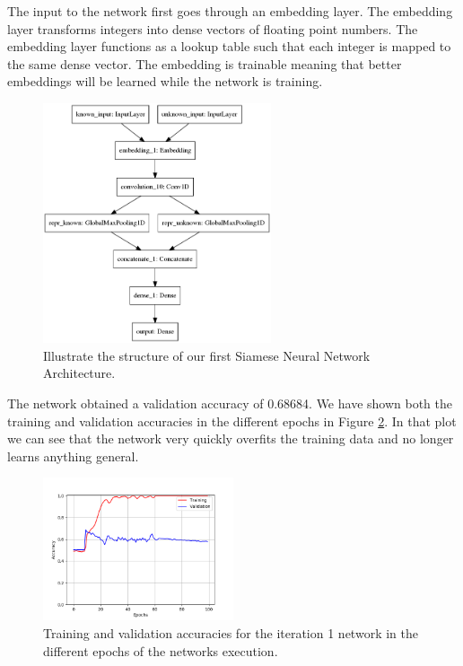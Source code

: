 The input to the network first goes through an embedding layer. The embedding
layer transforms integers into dense vectors of floating point numbers. The
embedding layer functions as a lookup table such that each integer is mapped
to the same dense vector. The embedding is trainable meaning that better
embeddings will be learned while the network is training.

\begin{figure}[htb]
    \centering
    \includegraphics[width=0.6\textwidth]{./pictures/method/network1.png}
    \caption{Illustrate the structure of our first Siamese Neural Network
        Architecture.}
    \label{fig:network_1}
\end{figure}

The network obtained a validation accuracy of 0.68684. We have shown both the
training and validation accuracies in the different epochs in Figure
\ref{fig:network1_accuracies}. In that plot we can see that the network very
quickly overfits the training data and no longer learns anything general.

\begin{figure}[htb]
    \centering
    \includegraphics[width=0.5\textwidth]{./pictures/method/network_1_accuracies.png}
    \caption{Training and validation accuracies for the iteration 1 network in
        the different epochs of the networks execution.}
    \label{fig:network1_accuracies}
\end{figure}

